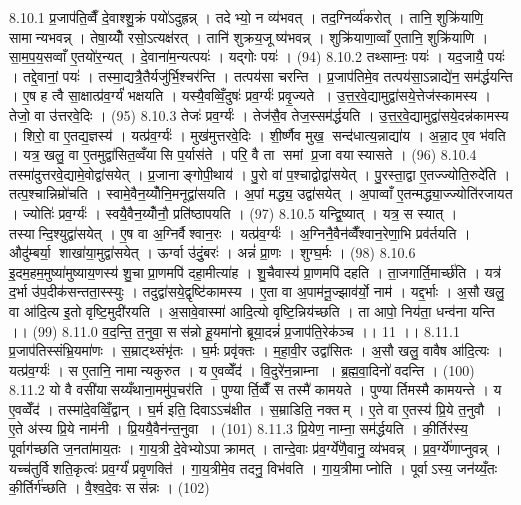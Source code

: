 8.10.1
प्र॒जाप॑ति॒व्वैँ दे॒वाश्शु॒क्रं पयो॑ऽदुह्रन्न् । तदेभ्यो॒ न व्य॑भवत् । तद॒ग्निर्व्य॑करोत् । तानि॒ शुक्रि॑याणि॒ सामान्यभवन्न् । तेषा॒य्योँ रसो॒ऽत्यक्ष॑रत् । तानि॑ शुक्रय॒जूष्य॑भवन्न् । शुक्रि॑याणा॒व्वाँ ए॒तानि॒ शुक्रि॑याणि । सा॒म॒प॒य॒सव्वाँ ए॒तयो॑र॒न्यत् । दे॒वाना॑म॒न्यत्पयः॑ । यद्गोः पयः॑ । (94)
8.10.2
तथ्साम्नः॒ पयः॑ । यद॒जायै॒ पयः॑ । तद्दे॒वानां॒ पयः॑ । तस्मा॒द्यत्रै॒तैर्यजु॑र्भि॒श्चर॑न्ति । तत्पय॑सा चरन्ति । प्र॒जाप॑तिमे॒व तत्पय॑सा॒ऽन्नाद्ये॑न॒ सम॑र्द्धयन्ति । ए॒ष ह त्वै सा॒क्षात्प्र॑व॒र्ग्यं॑ भक्षयति । यस्यै॒वव्विँ॒दुषः॑ प्रव॒र्ग्यः॑ प्रवृ॒ज्यते । उ॒त्त॒र॒वे॒द्यामुद्वा॑सये॒त्तेज॑स्कामस्य । तेजो॒ वा उ॑त्तरवे॒दिः । (95)
8.10.3
तेजः॑ प्रव॒र्ग्यः॑ । तेज॑सै॒व तेज॒स्सम॑र्द्धयति । उ॒त्त॒र॒वे॒द्यामुद्वा॑सये॒दन्न॑कामस्य । शिरो॒ वा ए॒तद्य॒ज्ञस्य॑ । यत्प्र॑व॒र्ग्यः॑ । मुख॑मुत्तरवे॒दिः । शी॒र्ष्णैव मुख॒॒ सन्द॑धात्य॒न्नाद्या॑य । अ॒न्ना॒द ए॒व भ॑वति । यत्र॒ खलु॒ वा ए॒तमुद्वा॑सित॒व्वँया॑सि प॒र्यास॑ते । परि॒ वै ता समां प्र॒जा वया॑स्यासते । (96)
8.10.4
तस्मा॑दुत्तरवे॒द्यामे॒वोद्वा॑सयेत् । प्र॒जानाङ्गोपी॒थाय॑ । पु॒रो वा॑ प॒श्चाद्वोद्वा॑सयेत् । पु॒रस्ता॒द्वा ए॒तज्ज्योति॒रुदे॑ति । तत्प॒श्चान्निम्रो॑चति । स्वामे॒वैन॒य्योँनि॒मनूद्वा॑सयति । अ॒पां मद्ध्य॒ उद्वा॑सयेत् । अ॒पाव्वाँ ए॒तन्मद्ध्या॒ज्ज्योति॑रजायत । ज्योतिः॑ प्रव॒र्ग्यः॑ । स्वयै॒वैन॒य्योँनौ॒ प्रति॑ष्ठापयति । (97)
8.10.5
यन्द्वि॒ष्यात् । यत्र॒ स स्यात् । तस्यान्दि॒श्युद्वा॑सयेत् । ए॒ष वा अ॒ग्निर्वैश्वान॒रः । यत्प्र॑व॒र्ग्यः॑ । अ॒ग्निनै॒वैन॑व्वैँश्वान॒रेणा॒भि प्रव॑र्तयति । औदु॑म्बर्या॒॒ शाखा॑या॒मुद्वा॑सयेत् । ऊर्ग्वा उ॑दुं॒बरः॑ । अन्नं॑ प्रा॒णः । शुग्घ॒र्मः । (98)
8.10.6
इ॒दम॒हम॒मुष्या॑मुष्याय॒णस्य॑ शु॒चा प्रा॒णमपि॑ दहा॒मीत्या॑ह । शु॒चैवास्य॑ प्रा॒णमपि॑ दहति । ता॒जगार्ति॒मार्च्छ॑ति । यत्र॑ द॒र्भा उ॑प॒दीक॑सन्तता॒स्स्युः । तदुद्वा॑सये॒द्वृष्टि॑कामस्य । ए॒ता वा अ॒पाम॑नू॒ज्झाव॑र्यो॒ नाम॑ । यद्द॒र्भाः । अ॒सौ खलु॒ वा आ॑दि॒त्य इ॒तो वृष्टि॒मुदी॑रयति । अ॒सावे॒वास्मा॑ आदि॒त्यो वृष्टि॒न्निय॑च्छति । ता आपो॒ निय॑ता॒ धन्व॑ना यन्ति ।। (99)
8.11.0
व॒द॒न्ति॒ त॒नुवा॒ सस॑न्नो हू॒यमा॑नो ब्रूया॒दन्नं॑ प्र॒जाप॑ति॒रेक॑ञ्च ।। 11 ।।
8.11.1
प्र॒जाप॑तिस्संभ्रि॒यमा॑णः । स॒म्राट्थ्संभृ॑तः । घ॒र्मः प्रवृ॑क्तः । म॒हा॒वी॒र उद्वा॑सितः । अ॒सौ खलु॒ वावैष आ॑दि॒त्यः । यत्प्र॑व॒र्ग्यः॑ । स ए॒तानि॒ नामान्यकुरुत । य ए॒वव्वेँद॑ । वि॒दुरे॑न॒न्नाम्ना । ब्र॒ह्म॒वा॒दिनो॑ वदन्ति । (100)
8.11.2
यो वै वसी॑यासय्यँथाना॒ममु॑प॒चर॑ति । पुण्यार्ति॒व्वैँ स तस्मै॑ कामयते । पुण्यार्तिमस्मै कामयन्ते । य ए॒वव्वेँद॑ । तस्मा॑दे॒वव्विँ॒द्वान् । घ॒र्म इति॒ दिवाऽऽच॑क्षीत । स॒म्राडिति॒ नक्तम् । ए॒ते वा ए॒तस्य॑ प्रि॒ये त॒नुवौ । ए॒ते अ॑स्य प्रि॒ये नाम॑नी । प्रि॒ययै॒वैन॑न्त॒नुवा । (101)
8.11.3
प्रि॒येण॒ नाम्ना॒ सम॑र्द्धयति । की॒र्तिर॑स्य॒ पूर्वाग॑च्छति ज॒नता॑माय॒तः । गा॒य॒त्री दे॒वेभ्योऽपाक्रामत् । तान्दे॒वाः प्र॑व॒र्ग्ये॑णै॒वानु॒ व्य॑भवन्न् । प्र॒व॒र्ग्ये॑णाप्नुवन्न् । यच्च॑तुर्विशति॒कृत्वः॑ प्रव॒र्ग्यं॑ प्रवृ॒णक्ति॑ । गा॒य॒त्रीमे॒व तदनु॒ विभ॑वति । गा॒य॒त्रीमाप्नोति । पूर्वाऽस्य॒ जन॑य्यँ॒तः की॒र्तिर्ग॑च्छति । वै॒श्व॒दे॒वः सस॑न्नः । (102)
